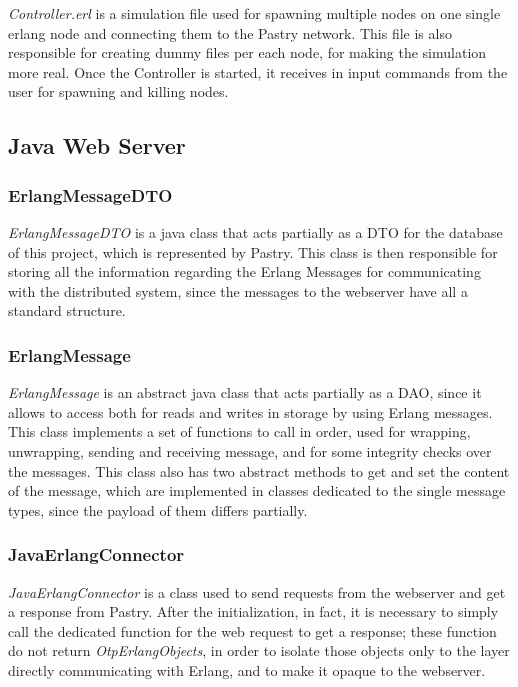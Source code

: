 \documentclass{article}
\begin{document}
\textit{Controller.erl} is a simulation file used for spawning multiple nodes on one single erlang node and connecting them to the Pastry network.
This file is also responsible for creating dummy files per each node, for making the simulation more real.
Once the Controller is started, it receives in input commands from the user for spawning and killing nodes.

\subsection{Java Web Server}

\subsubsection{ErlangMessageDTO}

\textit{ErlangMessageDTO} is a java class that acts partially as a DTO for the database of this project, which is represented by Pastry.
This class is then responsible for storing all the information regarding the Erlang Messages for communicating with the distributed system, 
since the messages to the webserver have all a standard structure.

\subsubsection{ErlangMessage}

\textit{ErlangMessage} is an abstract java class that acts partially as a DAO, since it allows to access both for reads and writes in storage by using 
Erlang messages. This class implements a set of functions to call in order, used for wrapping, unwrapping, sending and receiving message, and 
for some integrity checks over the messages. This class also has two abstract methods to get and set the content of the message, which are implemented in 
classes dedicated to the single message types, since the payload of them differs partially.

\subsubsection{JavaErlangConnector}

\textit{JavaErlangConnector} is a class used to send requests from the webserver and get a response from Pastry.
After the initialization, in fact, it is necessary to simply call the dedicated function for the web request to get a 
response; these function do not return \textit{OtpErlangObjects}, in order to isolate those objects only to the layer 
directly communicating with Erlang, and to make it opaque to the webserver.
\end{document}

